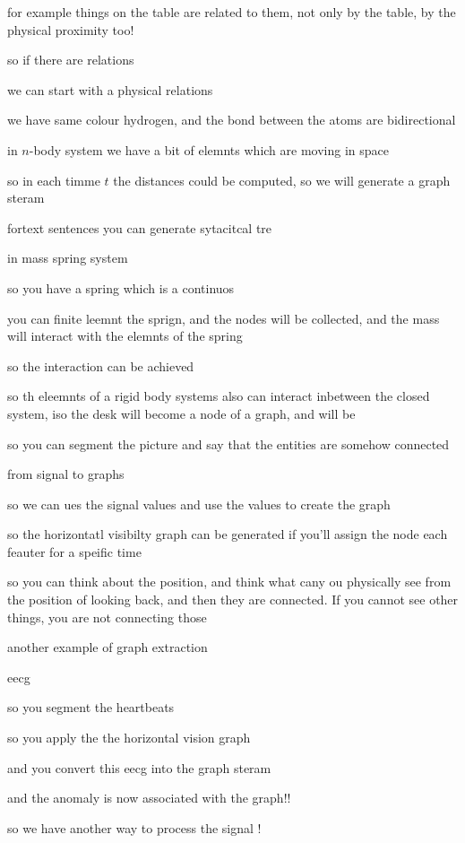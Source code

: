 \documentclass{article}
\begin{document}
for example things on the table are related to them, not only by the table, by the physical proximity too!

so if there are relations

we can start with a physical relations 

we have same colour hydrogen, and the bond between the atoms are bidirectional

in $n$-body system we have a bit of elemnts which are moving in space

so in each timme $t$ the distances could be computed, so we will generate a graph steram

fortext sentences  you can generate sytacitcal tre



in mass spring system


so you have a spring which is a continuos

you can finite leemnt the sprign, and the nodes will be collected, and the mass will interact with the elemnts of the spring 

so the interaction can be achieved 

so th eleemnts of a rigid body systems also can interact inbetween the closed system, iso the desk will become a node of a graph, and will be 

so you can segment the picture and say that the entities are somehow connected


from signal to graphs 

so we can ues the signal values and use the values to create the graph

so the horizontatl visibilty graph can be generated if you'll assign the node each feauter for a speific time

so you can think about the position, and think what cany ou physically see from the position of looking back, and then they are connected. If you cannot see other things, you are not connecting those


another example of graph extraction 


eecg 

so you segment the heartbeats

so you apply the the horizontal vision graph

and you convert this eecg into the graph steram

and the anomaly is now associated with the graph!!

so we have another way to process the signal !
\end{document}
